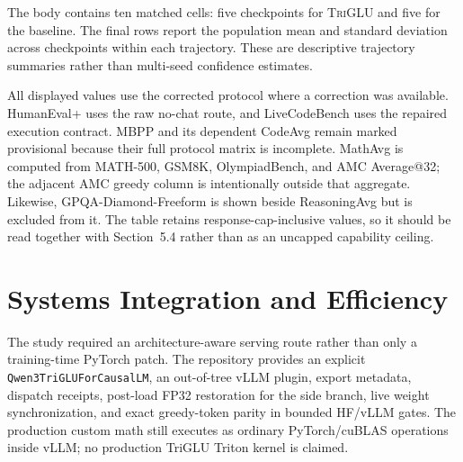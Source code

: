 \documentclass[10pt]{article}
\newcommand{\TriGLU}{\textsc{TriGLU}}
\begin{document}
The body contains ten matched cells: five checkpoints for \TriGLU{} and five
for the baseline.  The final rows report the population mean and standard
deviation across checkpoints within each trajectory.  These are descriptive
trajectory summaries rather than multi-seed confidence estimates.

All displayed values use the corrected protocol where a correction was
available.  HumanEval+ uses the raw no-chat route, and LiveCodeBench uses the
repaired execution contract.  MBPP and its dependent CodeAvg remain marked
provisional because their full protocol matrix is incomplete.  MathAvg is
computed from MATH-500, GSM8K, OlympiadBench, and AMC Average@32; the adjacent
AMC greedy column is intentionally outside that aggregate.  Likewise,
GPQA-Diamond-Freeform is shown beside ReasoningAvg but is excluded from it.
The table retains response-cap-inclusive values, so it should be read together
with Section~5.4 rather than as an uncapped capability ceiling.

\clearpage
\begin{landscape}
\begin{table}[H]
\centering
\caption{Full corrected Math and OOD results at matched RL steps 158, 196,
226, 256, and 294, including across-checkpoint means and population standard
deviations.  MathAvg uses AMC Average@32, not AMC greedy.  ReasoningAvg excludes
GPQA-Diamond-Freeform.  All Avg columns are intentionally muted; the three
emphasized columns are hard generative benchmarks.  MBPP and CodeAvg remain
provisional.}
\label{tab:mastertable}

\end{table}
\end{landscape}
\clearpage

\section{Systems Integration and Efficiency}

The study required an architecture-aware serving route rather than only a
training-time PyTorch patch.  The repository provides an explicit
\texttt{Qwen3TriGLUForCausalLM}, an out-of-tree vLLM plugin, export metadata,
dispatch receipts, post-load FP32 restoration for the side branch, live weight
synchronization, and exact greedy-token parity in bounded HF/vLLM gates.  The
production custom math still executes as ordinary PyTorch/cuBLAS operations
inside vLLM; no production TriGLU Triton kernel is claimed.
\end{document}
